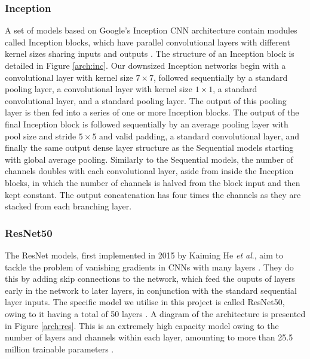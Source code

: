 \documentclass[12pt]{article}
\begin{document}
\subsubsection{Inception}
A set of models based on Google's Inception CNN architecture contain modules called Inception blocks, which have parallel convolutional layers with different kernel sizes sharing inputs and outputs \cite{Szegedy15}. The structure of an Inception block is detailed in Figure \ref{arch:inc}. Our downsized Inception networks begin with a convolutional layer with kernel size $7\times7$, followed sequentially by a standard pooling layer, a convolutional layer with kernel size $1\times1$, a standard convolutional layer, and a standard pooling layer. The output of this pooling layer is then fed into a series of one or more Inception blocks. The output of the final Inception block is followed sequentially by an average pooling layer with pool size and stride $5\times5$ and valid padding, a standard convolutional layer, and finally the same output dense layer structure as the Sequential models starting with global average pooling. Similarly to the Sequential models, the number of channels doubles with each convolutional layer, aside from inside the Inception blocks, in which the number of channels is halved from the block input and then kept constant. The output concatenation has four times the channels as they are stacked from each branching layer.

\subsubsection{ResNet50}
The ResNet models, first implemented in 2015 by Kaiming He \textit{et al}., aim to tackle the problem of vanishing gradients in CNNs with many layers \cite{He15}. They do this by adding skip connections to the network, which feed the ouputs of layers early in the network to later layers, in conjunction with the standard sequential layer inputs. The specific model we utilise in this project is called ResNet50, owing to it having a total of 50 layers \cite{He15}. A diagram of the architecture is presented in Figure \ref{arch:res}. This is an extremely high capacity model owing to the number of layers and channels within each layer, amounting to more than 25.5 million trainable parameters \cite{He15}.
\end{document}
